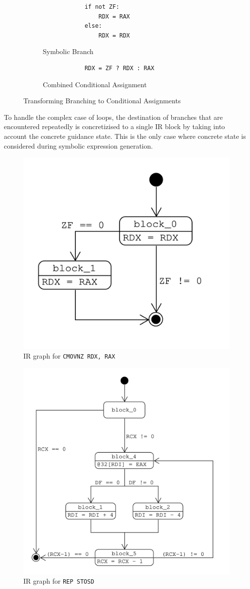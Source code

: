\begin{figure}[htpb]
    \begin{subfigure}[b]{0.3\linewidth}
        \begin{lstlisting}
            if not ZF:
                RDX = RAX
            else:
                RDX = RDX
        \end{lstlisting}
        \caption{Symbolic Branch}\label{fig:symb_conditional_1}
    \end{subfigure}
    \hfill
    \begin{subfigure}[b]{0.5\linewidth}
        \begin{lstlisting}
            RDX = ZF ? RDX : RAX
        \end{lstlisting}
        \caption{Combined Conditional Assignment}\label{fig:symb_conditional_2}
    \end{subfigure}
    \caption{Transforming Branching to Conditional Assignments}
    \label{fig:symb_branch_to_assign}
\end{figure}

To handle the complex case of loops, the destination of branches that are encountered repeatedly is concretizised to a
single IR block by taking into account the concrete guidance state. This is the only case where concrete state is
considered during symbolic expression generation.

\begin{figure}[htpb]
    \centering
    \includegraphics[width=0.5\linewidth]{figures/ir_graph_cmov.png}
    \caption{IR graph for \texttt{CMOVNZ RDX, RAX}}\label{fig:ir_graph_cmov}
\end{figure}

\begin{figure}[htpb]
    \centering
    \includegraphics[width=0.7\linewidth]{figures/ir_graph_repstod.png}
    \caption{IR graph for \texttt{REP STOSD}}\label{fig:ir_graph_repstod}
\end{figure}
